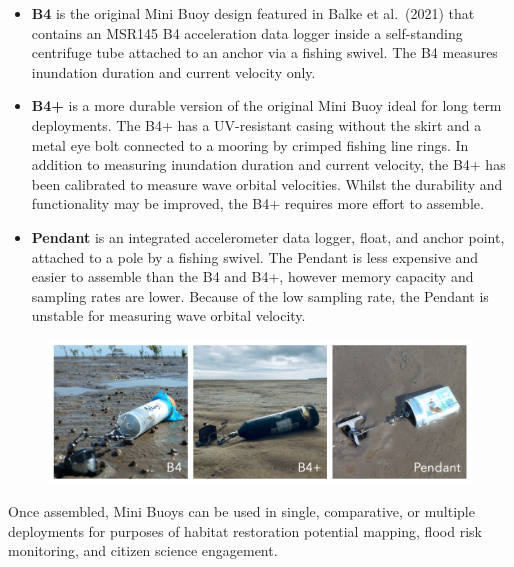 \documentclass[
  letterpaper,
  DIV=11,
  numbers=noendperiod]{scrreprt}
\providecommand{\tightlist}{%
  \setlength{\itemsep}{0pt}\setlength{\parskip}{0pt}}\usepackage{longtable,booktabs,array}
\begin{document}
\begin{itemize}
\tightlist
\item
  \textbf{B4} is the original Mini Buoy design featured in Balke et
  al.~(2021) that contains an MSR145 B4 acceleration data logger inside
  a self-standing centrifuge tube attached to an anchor via a fishing
  swivel. The B4 measures inundation duration and current velocity
  only.\\
\item
  \textbf{B4+} is a more durable version of the original Mini Buoy ideal
  for long term deployments. The B4+ has a UV-resistant casing without
  the skirt and a metal eye bolt connected to a mooring by crimped
  fishing line rings. In addition to measuring inundation duration and
  current velocity, the B4+ has been calibrated to measure wave orbital
  velocities. Whilst the durability and functionality may be improved,
  the B4+ requires more effort to assemble.
\item
  \textbf{Pendant} is an integrated accelerometer data logger, float,
  and anchor point, attached to a pole by a fishing swivel. The Pendant
  is less expensive and easier to assemble than the B4 and B4+, however
  memory capacity and sampling rates are lower. Because of the low
  sampling rate, the Pendant is unstable for measuring wave orbital
  velocity.
\end{itemize}

\begin{figure}

{\centering \includegraphics{chapters/figs/MiniBuoysPhotos.png}

}

\end{figure}

Once assembled, Mini Buoys can be used in single, comparative, or
multiple deployments for purposes of habitat restoration potential
mapping, flood risk monitoring, and citizen science engagement.
\end{document}
